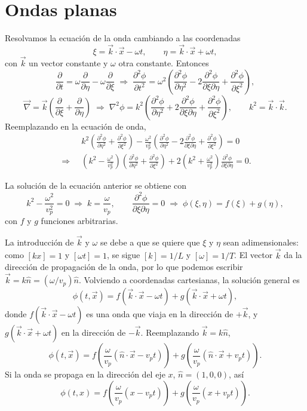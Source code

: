 \section{Ondas planas}

Resolvamos la ecuación de la onda cambiando a las coordenadas
\[
\xi = \vec k\cdot\vec x - \omega t, \qquad \eta = \vec k\cdot\vec x +
\omega t,
\]
con $\vec k$ un vector constante y $\omega$ otra constante. Entonces
\[
\frac{\partial}{\partial t} = \omega\frac{\partial}{\partial\eta} -
\omega\frac{\partial}{\partial\xi} \;\Longrightarrow\; \frac{\partial^2
\phi}{\partial t^2} = \omega^2\left(\frac{\partial^2\phi}{\partial\eta^2}
- 2\frac{\partial^2\phi}{\partial\xi\partial\eta} + \frac{\partial^2
\phi}{\partial\xi^2}\right),
\]
\[
\vec\nabla = \vec k\left(\frac{\partial}{\partial\xi}+\frac{\partial}
{\partial\eta}\right) \;\Longrightarrow\; \nabla^2\phi =
k^2\left(\frac{\partial^2\phi}{\partial\eta^2} + 2\frac{\partial^2
\phi}{\partial\xi\partial\eta} + \frac{\partial^2\phi}{\partial\xi^2}
\right), \qquad k^2 = \vec k\cdot\vec k .
\]
Reemplazando en la ecuación de onda,
\begin{align*}
&k^2\left(\frac{\partial^2\phi}{\partial\eta^2}+\frac{\partial^2\phi}
{\partial\xi^2}\right) - \frac{\omega^2}{v_p^2}\left(\frac{\partial^2
\phi}{\partial\eta^2}-2\frac{\partial^2\phi}{\partial\xi\partial\eta}+
\frac{\partial^2\phi}{\partial\xi^2}\right) = 0 \\
\;\Longrightarrow\;\; &\left(k^2-\frac{\omega^2}{v_p^2}\right)\left(\frac{\partial^2\phi}
{\partial\eta^2}+\frac{\partial^2\phi}{\partial\xi^2}\right) +
2\left(k^2+\frac{\omega^2}{v_p^2}\right)\frac{\partial^2\phi}{\partial
\xi\partial\eta} = 0 .
\end{align*}

\begin{proposicionc}
La solución de la ecuación anterior se obtiene con
\[
k^2 - \frac{\omega^2}{v_p^2} = 0 \;\Longrightarrow\; k=\frac{\omega}
{v_p}, \qquad \frac{\partial^2\phi}{\partial\xi\partial\eta} = 0
\;\Longrightarrow\; \phi(\xi,\eta) = f(\xi)+g(\eta),
\]
con $f$ y $g$ funciones arbitrarias.
\end{proposicionc}

La introducción de $\vec k$ y $\omega$ se debe a que se quiere que
$\xi$ y $\eta$ sean adimensionales: como $[kx]=1$ y $[\omega t]=1$, se
sigue $[k]=1/L$ y $[\omega]=1/T$. El vector $\vec k$ da la dirección de
propagación de la onda, por lo que podemos escribir $\vec k = k\hat n =
(\omega/v_p)\hat n$. Volviendo a coordenadas cartesianas, la solución
general es
\[
\phi(t,\vec x) = f(\vec k\cdot\vec x - \omega t) + g(\vec k\cdot\vec x +
\omega t),
\]
donde $f(\vec k\cdot\vec x-\omega t)$ es una onda que viaja en la
dirección de $+\vec k$, y $g(\vec k\cdot\vec x+\omega t)$ en la
dirección de $-\vec k$. Reemplazando $\vec k=k\hat n$,
\[
\phi(t,\vec x) = f\!\left(\frac{\omega}{v_p}(\hat n\cdot\vec x -
v_pt)\right) + g\!\left(\frac{\omega}{v_p}(\hat n\cdot\vec x + v_pt)
\right).
\]
Si la onda se propaga en la dirección del eje $x$, $\hat n=(1,0,0)$, así
\[
\phi(t,x) = f\!\left(\frac{\omega}{v_p}(x-v_pt)\right) +
g\!\left(\frac{\omega}{v_p}(x+v_pt)\right).
\]

